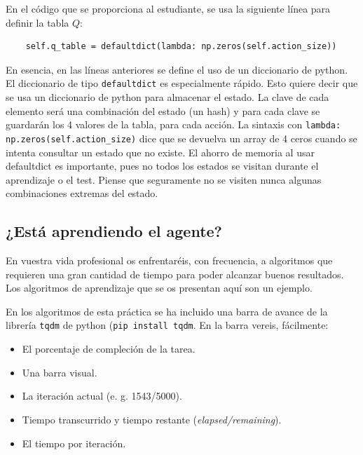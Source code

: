\documentclass{article}
\begin{document}
En el código que se proporciona al estudiante, se usa la siguiente línea para definir la tabla $Q$:
\begin{verbatim}
    self.q_table = defaultdict(lambda: np.zeros(self.action_size))
\end{verbatim}
En esencia, en las líneas anteriores se define el uso de un diccionario de python. El diccionario de tipo \texttt{defaultdict} es especialmente rápido. Esto quiere decir que se usa un diccionario de python para almacenar el estado. La clave de cada elemento será una combinación del estado (un hash) y para cada clave se guardarán los 4 valores de la tabla, para cada acción. La sintaxis con \texttt{lambda: np.zeros(self.action\_size)} dice que se devuelva un array de 4 ceros cuando se intenta consultar un estado que no existe. El ahorro de memoria al usar defaultdict es importante, pues no todos los estados se visitan durante el aprendizaje o el test. Piense que seguramente no se visiten nunca algunas combinaciones extremas del estado. 


\subsection{¿Está aprendiendo el agente?}
En vuestra vida profesional os enfrentaréis, con frecuencia, a algoritmos que requieren una gran cantidad de tiempo para poder alcanzar buenos resultados. Los algoritmos de aprendizaje que se os presentan aquí son un ejemplo. 

En los algoritmos de esta práctica se ha incluido una barra de avance de la librería \texttt{tqdm} de python (\texttt{pip install tqdm}. En la barra vereis, fácilmente:
\begin{itemize}
	\item El porcentaje de compleción de la tarea.
	\item Una barra visual.
	\item La iteración actual (e. g. 1543/5000).
	\item Tiempo transcurrido y tiempo restante (\textit{elapsed/remaining}).
	\item El tiempo por iteración.
\end{itemize}
\end{document}
